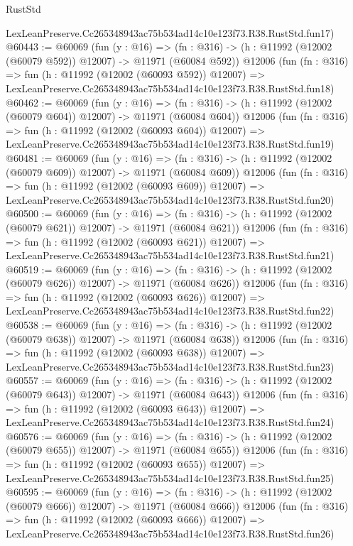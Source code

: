 \begin{lexlean}{RustStd}
\begin{coremodule}
    LexLeanPreserve.Cc265348943ac75b534ad14c10e123f73.R38.RustStd.fun17)
@60443 := @60069
    (fun (y : @16) =>
    (fn : @316) -> (h : @11992 (@12002 (@60079 @592)) @12007) -> @11971 (@60084 @592))
    @12006
    (fun (fn : @316) =>
    fun (h : @11992 (@12002 (@60093 @592)) @12007) =>
    LexLeanPreserve.Cc265348943ac75b534ad14c10e123f73.R38.RustStd.fun18)
@60462 := @60069
    (fun (y : @16) =>
    (fn : @316) -> (h : @11992 (@12002 (@60079 @604)) @12007) -> @11971 (@60084 @604))
    @12006
    (fun (fn : @316) =>
    fun (h : @11992 (@12002 (@60093 @604)) @12007) =>
    LexLeanPreserve.Cc265348943ac75b534ad14c10e123f73.R38.RustStd.fun19)
@60481 := @60069
    (fun (y : @16) =>
    (fn : @316) -> (h : @11992 (@12002 (@60079 @609)) @12007) -> @11971 (@60084 @609))
    @12006
    (fun (fn : @316) =>
    fun (h : @11992 (@12002 (@60093 @609)) @12007) =>
    LexLeanPreserve.Cc265348943ac75b534ad14c10e123f73.R38.RustStd.fun20)
@60500 := @60069
    (fun (y : @16) =>
    (fn : @316) -> (h : @11992 (@12002 (@60079 @621)) @12007) -> @11971 (@60084 @621))
    @12006
    (fun (fn : @316) =>
    fun (h : @11992 (@12002 (@60093 @621)) @12007) =>
    LexLeanPreserve.Cc265348943ac75b534ad14c10e123f73.R38.RustStd.fun21)
@60519 := @60069
    (fun (y : @16) =>
    (fn : @316) -> (h : @11992 (@12002 (@60079 @626)) @12007) -> @11971 (@60084 @626))
    @12006
    (fun (fn : @316) =>
    fun (h : @11992 (@12002 (@60093 @626)) @12007) =>
    LexLeanPreserve.Cc265348943ac75b534ad14c10e123f73.R38.RustStd.fun22)
@60538 := @60069
    (fun (y : @16) =>
    (fn : @316) -> (h : @11992 (@12002 (@60079 @638)) @12007) -> @11971 (@60084 @638))
    @12006
    (fun (fn : @316) =>
    fun (h : @11992 (@12002 (@60093 @638)) @12007) =>
    LexLeanPreserve.Cc265348943ac75b534ad14c10e123f73.R38.RustStd.fun23)
@60557 := @60069
    (fun (y : @16) =>
    (fn : @316) -> (h : @11992 (@12002 (@60079 @643)) @12007) -> @11971 (@60084 @643))
    @12006
    (fun (fn : @316) =>
    fun (h : @11992 (@12002 (@60093 @643)) @12007) =>
    LexLeanPreserve.Cc265348943ac75b534ad14c10e123f73.R38.RustStd.fun24)
@60576 := @60069
    (fun (y : @16) =>
    (fn : @316) -> (h : @11992 (@12002 (@60079 @655)) @12007) -> @11971 (@60084 @655))
    @12006
    (fun (fn : @316) =>
    fun (h : @11992 (@12002 (@60093 @655)) @12007) =>
    LexLeanPreserve.Cc265348943ac75b534ad14c10e123f73.R38.RustStd.fun25)
@60595 := @60069
    (fun (y : @16) =>
    (fn : @316) -> (h : @11992 (@12002 (@60079 @666)) @12007) -> @11971 (@60084 @666))
    @12006
    (fun (fn : @316) =>
    fun (h : @11992 (@12002 (@60093 @666)) @12007) =>
    LexLeanPreserve.Cc265348943ac75b534ad14c10e123f73.R38.RustStd.fun26)

\end{coremodule}
\end{lexlean}
